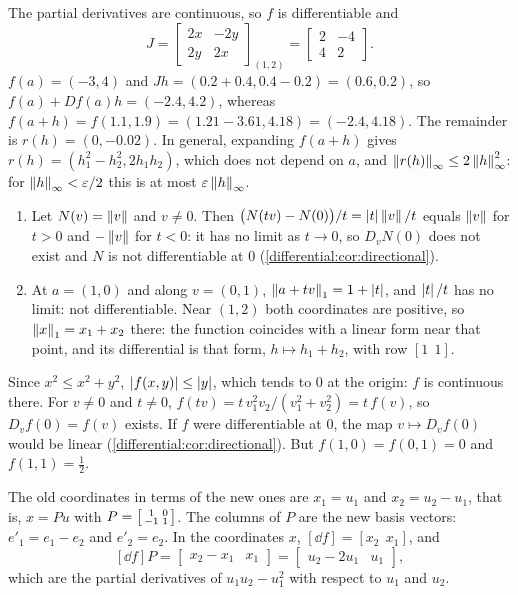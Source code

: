 The partial derivatives are continuous, so $f$ is differentiable and
\[
  J = \begin{bmatrix}2x & -2y\\2y & 2x\end{bmatrix}_{(1, 2)}
  = \begin{bmatrix}2 & -4\\4 & 2\end{bmatrix} .
\]
$f(a) = (-3, 4)$ and $Jh = (0.2 + 0.4, 0.4 - 0.2) = (0.6, 0.2)$, so
$f(a) + Df(a)h = (-2.4, 4.2)$, whereas
$f(a + h) = f(1.1, 1.9) = (1.21 - 3.61, 4.18) = (-2.4, 4.18)$. The
remainder is $r(h) = (0, -0.02)$. In general, expanding
$f(a + h)$ gives $r(h) = (h_1^2 - h_2^2, 2h_1h_2)$, which does not depend
on $a$, and $\left\|r(h)\right\|_\infty\leq2\left\|h\right\|_\infty^2$: for
$\left\|h\right\|_\infty < \varepsilon/2$ this is at most
$\varepsilon\left\|h\right\|_\infty$.

\begin{enumerate}[nosep]
  \item Let $N(v) = \left\|v\right\|$ and $v\neq0$. Then
        $\bigl(N(tv) - N(0)\bigr)/t = \left|t\right|\left\|v\right\|/t$ equals $\left\|v\right\|$
        for $t > 0$ and $-\left\|v\right\|$ for $t < 0$: it has no limit as
        $t\to0$, so $D_vN(0)$ does not exist and $N$ is not differentiable
        at $0$ (\cref{differential:cor:directional}).
  \item At $a = (1, 0)$ and along $v = (0, 1)$,
        $\left\|a + tv\right\|_1 = 1 + \left|t\right|$, and $\left|t\right|/t$ has no limit: not
        differentiable. Near $(1, 2)$ both coordinates are positive, so
        $\left\|x\right\|_1 = x_1 + x_2$ there: the function coincides with a
        linear form near that point, and its differential is that form,
        $h\mapsto h_1 + h_2$, with row $[1\ \ 1]$.
\end{enumerate}

Since $x^2\leq x^2 + y^2$, $\left|f(x, y)\right|\leq\left|y\right|$, which tends to $0$
at the origin: $f$ is continuous there. For $v\neq0$ and $t\neq0$,
$f(tv) = t\,v_1^2v_2/(v_1^2 + v_2^2) = t\,f(v)$, so $D_vf(0) = f(v)$
exists. If $f$ were differentiable at $0$, the map $v\mapsto D_vf(0)$
would be linear (\cref{differential:cor:directional}). But
$f(1, 0) = f(0, 1) = 0$ and $f(1, 1) = \frac12$.

The old coordinates in terms of the new ones are $x_1 = u_1$ and
$x_2 = u_2 - u_1$, that is, $x = Pu$ with
$P = \begin{bsmallmatrix}1 & 0\\-1 & 1\end{bsmallmatrix}$. The columns of
$P$ are the new basis vectors: $e'_1 = e_1 - e_2$ and $e'_2 = e_2$. In the
coordinates $x$, $[\dd f] = [x_2\ \ x_1]$, and
\[
  [\dd f]P = \begin{bmatrix}x_2 - x_1 & x_1\end{bmatrix}
  = \begin{bmatrix}u_2 - 2u_1 & u_1\end{bmatrix} ,
\]
which are the partial derivatives of $u_1u_2 - u_1^2$ with respect to
$u_1$ and $u_2$.

